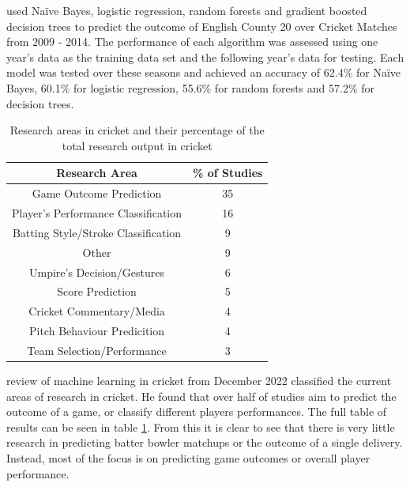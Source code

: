 \documentclass[12pt,a4paper]{report}
\theoremstyle{definition}
\begin{document}
\citet{KampakisStylianos2015} used Naïve Bayes, logistic regression, random forests and gradient boosted decision trees to predict the outcome of English County 20 over Cricket Matches from 2009 - 2014. 
The performance of each algorithm was assessed using one year's data as the training data set and the following year's data for testing. 
Each model was tested over these seasons and achieved an accuracy of 62.4\% for Naïve Bayes, 60.1\% for logistic regression, 55.6\% for random forests and 57.2\% for decision trees.

\begin{table}[H] \label{tab:ResearchCrick}
	\centering
	\caption{Research areas in cricket and their percentage of the total research output in cricket \citep{Wickramasinghe2022}}
	\begin{tabular}{||c c ||} 
		\hline
		Research Area & \% of Studies \\ [0.5ex] 
		\hline\hline
		Game Outcome Prediction & 35 \\ 
		\hline
		Player's Performance Classification & 16 \\
		\hline
		Batting Style/Stroke Classification & 9 \\
		\hline
		Other & 9 \\
		\hline
		Umpire's Decision/Gestures & 6 \\
		\hline
		Score Prediction & 5 \\
		\hline
		Cricket Commentary/Media & 4 \\
		\hline
		Pitch Behaviour Predicition & 4 \\
		\hline
		Team Selection/Performance & 3 \\ [1ex] 
	\hline
	\end{tabular}
\end{table}

\citet{Wickramasinghe2022} review of machine learning in cricket from December 2022 classified the current areas of research in cricket. 
He found that over half of studies aim to predict the outcome of a game, or classify different players performances. 
The full table of results can be seen in table \ref{tab:ResearchCrick}. 
From this it is clear to see that there is very little research in predicting batter bowler matchups or the outcome of a single delivery. 
Instead, most of the focus is on predicting game outcomes or overall player performance.
\end{document}
